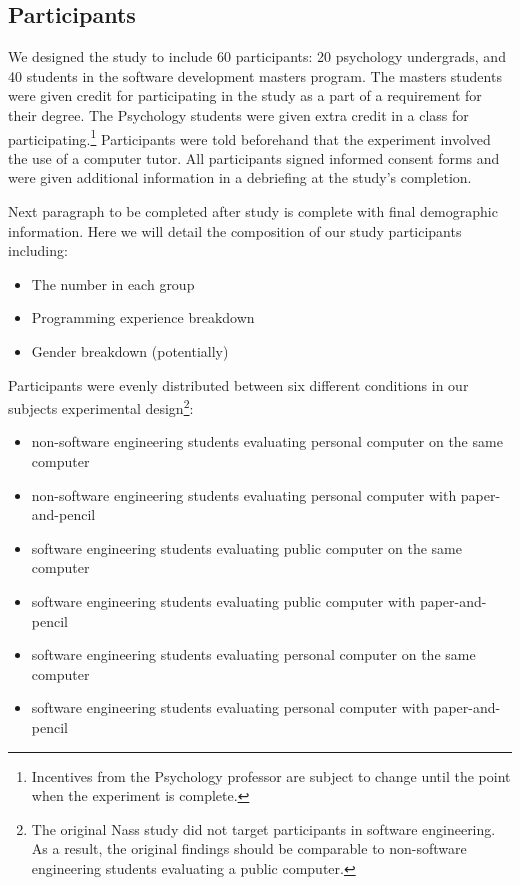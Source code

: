 \documentclass{sig-alternate-05-2015}
\begin{document}
\subsection{Participants}
We designed the study to include 60 participants: 20 psychology undergrads, and 40 students in the software development masters program. The masters students were given credit for participating in the study as a part of a requirement for their degree.  The Psychology students were given extra credit in a class for participating.\footnote{Incentives from the Psychology professor are subject to change until the point when the experiment is complete.}  Participants were told beforehand that the experiment involved the use of a computer tutor.  All participants signed informed consent forms and were given additional information in a debriefing at the study's completion.

Next paragraph to be completed after study is complete with final demographic information.
Here we will detail the composition of our study participants including:
\begin{itemize}
    \item The number in each group
    \item Programming experience breakdown
    \item Gender breakdown (potentially)
\end{itemize}

Participants were evenly distributed between six different conditions in our subjects experimental design\footnote{The original Nass study did not target participants in software engineering. As a result, the original findings should be comparable to non-software engineering students evaluating a public computer.}:
\begin{itemize}
    \item non-software engineering students evaluating personal computer on the same  computer
    \item non-software engineering students evaluating personal computer with paper-and-pencil
    \item software engineering students evaluating public computer on the same computer
    \item software engineering students evaluating public computer with paper-and-pencil
    \item software engineering students evaluating personal computer on the same computer
    \item software engineering students evaluating personal computer with paper-and-pencil
\end{itemize}
\end{document}
